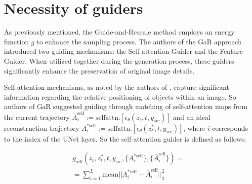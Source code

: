 \clearpage
\setcounter{page}{1}

\appendix

\twocolumn[{
\renewcommand\twocolumn[1][]{#1}
\maketitlesupplementary
\begin{center}
    \vspace{-15pt}
    \texttt{[image: images/guiders\_together\_compressed.png]}
    \captionsetup{type=figure}
    \caption{Illustration of the significance of using guiders: (Left) Self-attention guider; (Right) Feature guider. Transferring material without these guiders fails to maintain the object's geometry, visual features, and pose.}
    \vspace{-0mm}
    \label{fig:guiders}
\end{center}
}]


\section{Necessity of guiders}
\label{appendix:guiders}


As previously mentioned, the Guide-and-Rescale method employs an energy function $g$ to enhance the sampling process. The authors of the GaR approach introduced two guiding mechanisms: the Self-attention Guider and the Feature Guider. When utilized together during the generation process, these guiders significantly enhance the preservation of original image details.


Self-attention mechanisms, as noted by the authors of \cite{tumanyan2023plug}, capture significant information regarding the relative positioning of objects within an image. So authors of GaR suggested guiding through matching of self-attention maps from the current trajectory $\overline{A}^{\mathrm{self}}_i := \mathrm{self attn.}[\epsilon_{\theta}(z_t, t, y_{\mathrm{src}})] $ and an ideal
reconstruction trajectory $A^{*\mathrm{self}}_i := \mathrm{self attn.}[\epsilon_{\theta}(z^*_t, t, y_{\mathrm{src}})]$, where $i$ corresponds
to the index of the UNet layer.
So the self-attention guider is defined as follows:

\begin{equation}
\begin{split}
g_{\mathrm{self}}(z_t, z_t^*, t, y_{\mathrm{src}}, \{A_i^{*\mathrm{self}}\}, \{\overline{A}_i^{\mathrm{self}}\}) = \\ =\sum_{i=1}^{L}\mathrm{mean}||A_i^{*\mathrm{self}} - \overline{A}_i^{\mathrm{self}}||_2^2
  \label{eq:self-guider-eq}
\end{split}
\end{equation}

